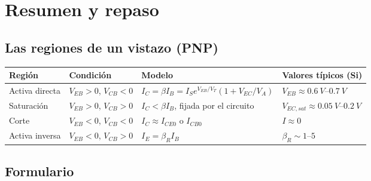 \section{Resumen y repaso}

\subsection{Las regiones de un vistazo (PNP)}

\begin{table}[H]
\centering\small
\begin{tabularx}{\textwidth}{l>{\raggedright\arraybackslash}p{2.6cm}>{\raggedright\arraybackslash}X>{\raggedright\arraybackslash}X}
\toprule
Región & Condición & Modelo & Valores típicos (Si) \\
\midrule
Activa directa & $V_{EB}>0$, $V_{CB}<0$ & $I_C=\beta I_B=I_Se^{V_{EB}/V_T}(1+V_{EC}/V_A)$ & $V_{EB}\approx\SIrange{0.6}{0.7}{V}$ \\
Saturación & $V_{EB}>0$, $V_{CB}>0$ & $I_C<\beta I_B$, fijada por el circuito & $V_{EC,sat}\approx\SIrange{0.05}{0.2}{V}$ \\
Corte & $V_{EB}<0$, $V_{CB}<0$ & $I_C\approx I_{CE0}$ o $I_{CB0}$ & $I\approx0$ \\
Activa inversa & $V_{EB}<0$, $V_{CB}>0$ & $I_E=\beta_RI_B$ & $\beta_R\sim1$--$5$ \\
\bottomrule
\end{tabularx}
\end{table}

\subsection{Formulario}

